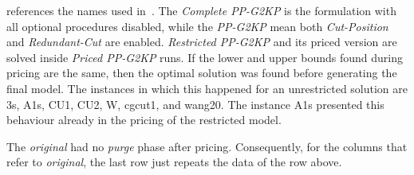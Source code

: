 \documentclass[ppgc,tese,english,formais,babel]{iiufrgs}
\begin{document}
 references the names used in~\citet{dimitri_thesis}.
The \emph{Complete PP-G2KP} is the formulation with all optional procedures disabled, while the \emph{PP-G2KP} mean both \emph{Cut-Position} and \emph{Redundant-Cut} are enabled.
\emph{Restricted PP-G2KP} and its priced version are solved inside \emph{Priced PP-G2KP} runs.
If the lower and upper bounds found during pricing are the same, then the optimal solution was found before generating the final model.
The instances in which this happened for an unrestricted solution are 3s, A1s, CU1, CU2, W, cgcut1, and wang20.
The instance A1s presented this behaviour already in the pricing of the restricted model.

The \emph{original} had no \emph{purge} phase after pricing.
Consequently, for the columns that refer to \emph{original}, the last row just repeats the data of the row above.
\end{document}
